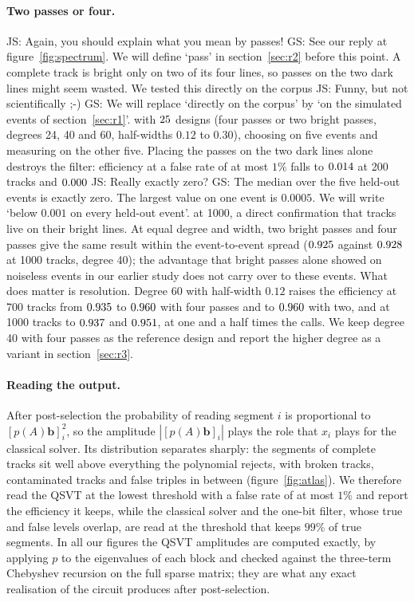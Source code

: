 \documentclass[11pt,a4paper]{article}
\newcommand{\js}[1]{{\color{blue} JS: #1 }}
\newcommand{\gs}[1]{{\color{orange!85!black} GS: #1 }}
\begin{document}
\paragraph{Two passes or four.}
\js{Again, you should explain what you mean by passes!} \gs{See our reply at figure~\ref{fig:spectrum}. We will define `pass' in section~\ref{sec:r2} before this point.}
A complete track is bright only on two of its four lines, so passes on the two dark lines might
seem wasted. We tested this directly on the corpus \js{Funny, but not scientifically ;-)} \gs{We will replace `directly on the corpus' by `on the simulated events of section~\ref{sec:r1}'.} with $25$ designs (four passes or two
bright passes, degrees 24, 40 and 60, half-widths $0.12$ to $0.30$), choosing on five events and
measuring on the other five. Placing the passes on the two dark lines alone destroys the filter:
efficiency at a false rate of at most $1\%$ falls to $0.014$ at 200 tracks and
$0.000$ \js{Really exactly zero?} \gs{The median over the five held-out events is exactly zero. The largest value on one event is $0.0005$. We will write `below $0.001$ on every held-out event'.} at 1000, a direct confirmation that tracks live on their bright lines. At equal
degree and width, two bright passes and four passes give the same result within the event-to-event
spread ($0.925$ against $0.928$ at 1000 tracks, degree 40); the
advantage that bright passes alone showed on noiseless events in our earlier study does not carry
over to these events. What does matter is resolution. Degree 60 with half-width $0.12$ raises the efficiency at 700 tracks from
$0.935$ to $0.960$ with four passes and to $0.960$ with two, and at
1000 tracks to $0.937$ and $0.951$, at one and a half times the calls.
We keep degree 40 with four passes as the reference design and report the higher degree as a variant
in section~\ref{sec:r3}.

\paragraph{Reading the output.}
After post-selection the probability of reading segment $i$ is proportional to
$[p(A)\mathbf{b}]_i^2$, so the amplitude $|[p(A)\mathbf{b}]_i|$ plays the role that $x_i$ plays for
the classical solver. Its distribution separates sharply: the segments of complete tracks sit well above
everything the polynomial rejects, with broken tracks, contaminated tracks and false triples in
between (figure~\ref{fig:atlas}).
We therefore read the QSVT at the lowest threshold with a false rate of at most $1\%$ and report the
efficiency it keeps, while the classical solver and the one-bit filter, whose true and false levels overlap, are read at the threshold that keeps $99\%$ of true segments. In all our figures the QSVT
amplitudes are computed exactly, by applying $p$ to the eigenvalues of each block and checked
against the three-term Chebyshev recursion on the full sparse matrix; they are what any exact
realisation of the circuit produces after post-selection.
\end{document}

